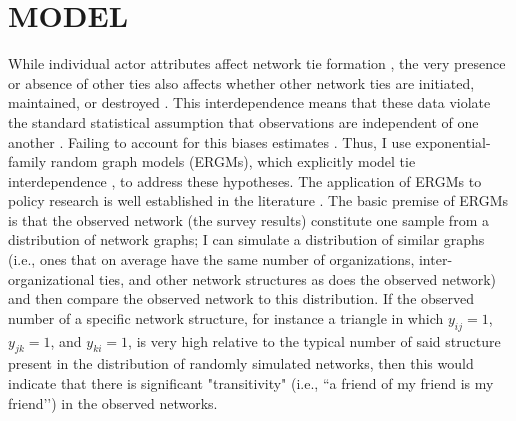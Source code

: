 \documentclass[12pt,a4paper,titlepage]{article}
\begin{document}
\section{\bf\MakeUppercase{Model}}

While individual actor attributes affect network tie formation \parencite{handcock2014}, the very presence or absence of other ties also affects whether other network ties are initiated, maintained, or destroyed \parencite{lubell2012}. This interdependence means that these data violate the standard statistical assumption that observations are independent of one another \parencite{robins2012}. Failing to account for this biases estimates \parencite{kolaczyk2009,krackhardt1988}. Thus, I use exponential-family random graph models (ERGMs), which explicitly model tie interdependence \parencite{lubell2012}, to address these hypotheses. The application of ERGMs to policy research is well established in the literature \parencite{feiock2010, henry2011, lubell2012}. The basic premise of ERGMs is that the observed network (the survey results) constitute one sample from a distribution of network graphs; I can simulate a distribution of similar graphs (i.e., ones that on average have the same number of organizations, inter-organizational ties, and other network structures as does the observed network) and then compare the observed network to this distribution. If the observed number of a specific network structure, for instance a triangle in which $y_{ij}=1$, $y_{jk}=1$, and $y_{ki}=1$, is very high relative to the typical number of said structure present in the distribution of randomly simulated networks, then this would indicate that there is significant "transitivity" (i.e., ``a friend of my friend is my friend’’) in the observed networks.
\end{document}
